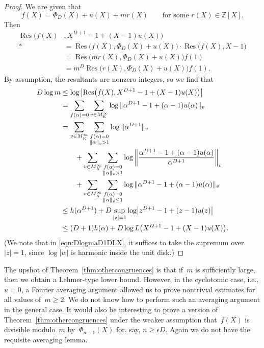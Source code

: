 \begin{proof}
We are given that
\[
  f(X) = {\Phi}_D(X) + u(X) + mr(X)
  \qquad\text{for some $r(X)\in{\mathbb{Z}}[X]$.}
\]
Then
\begin{align*}
  {\operatorname{Res}}\bigl(f(X)&,X^{D+1}-1+(X-1)u(X)\bigr)\\*
  &= {\operatorname{Res}}\bigl(f(X),{\Phi}_D(X)+u(X)\bigr)
     \cdot{\operatorname{Res}}\bigl(f(X),X-1\bigr) \\
  &= {\operatorname{Res}}\bigl(mr(X),{\Phi}_D(X)+u(X)\bigr)f(1) \\
  &= m^D{\operatorname{Res}}\bigl(r(X),{\Phi}_D(X)+u(X)\bigr)f(1).
\end{align*}
By assumption, the resultants are nonzero integers, so we find that
\begin{align}
  \label{eqn:DlogmaD1DLX}
  D\log m
  &\le \log\left|{\operatorname{Res}}\bigl(f(X),X^{D+1}-1+(X-1)u(X)\bigr)\right| 
    \notag\\
  &= \sum_{f({\alpha})=0} \sum_{v\in M_K^\infty} \log\|{\alpha}^{D+1}-1+({\alpha}-1)u({\alpha})\|_v
    \notag\\
  &= \sum_{v\in M_K^\infty}\sum_{\substack{f({\alpha})=0\\\|{\alpha}\|_v>1\\}} \log\|{\alpha}^{D+1}\|_v \notag\\
  &\qquad{}  + \sum_{v\in M_K^\infty}\sum_{\substack{f({\alpha})=0\\\|{\alpha}\|_v>1\\}} 
            \log\left\|\frac{{\alpha}^{D+1}-1+({\alpha}-1)u({\alpha})}{{\alpha}^{D+1}}\right\|_v \notag\\
  &\qquad{}  + \sum_{v\in M_K^\infty}\sum_{\substack{f({\alpha})=0\\\|{\alpha}\|_v\le1\\}} 
                  \log\|{\alpha}^{D+1}-1+({\alpha}-1)u({\alpha})\|_v  \notag\\
  &\le h({\alpha}^{D+1}) + D\sup_{|z|=1}\log\bigl|z^{D+1}-1+(z-1)u(z)\bigr| \\
  &\le (D+1)h({\alpha}) + D\log L\bigl(X^{D+1}-1+(X-1)u(X)\bigr). \notag
\end{align}
(We note that in \eqref{eqn:DlogmaD1DLX}, it suffices to take the
supremum over~$|z|=1$, since $\log|w|$ is harmonic inside the unit
disk.)
\end{proof}

\begin{remark}
The upshot of Theorem~\ref{thm:othercongruences} is that if~$m$ is
sufficiently large, then we obtain a Lehmer-type lower bound. However,
in the cyclotomic case, i.e., $u=0$, a Fourier averaging argument allowed us to
prove nontrivial estimates for all values of~$m\ge2$.  We do not know
how to perform such an averaging argument in the general case. It
would also be interesting to prove a version of
Theorem~\ref{thm:othercongruences} under the weaker assumption
that~$f(X)$ is divisible modulo~$m$ by~${\Phi}_{n-1}(X)$ for, say, $n\ge{\epsilon}
D$. Again we do not have the requisite averaging lemma.
\end{remark}

